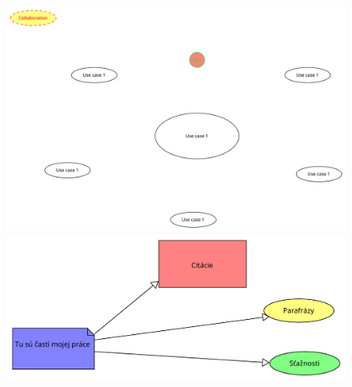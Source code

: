 \documentclass[10pt,twocolumn,twoside,slovak,a4paper]{article}
\begin{document}
\begin{figure}
	\centering
	\includegraphics[scale=0.2]{diagram.pdf}
	\includegraphics[scale=0.4]{diagram horizontal.pdf}
\end{figure}





\newpage



\begin{figure}
	
\end{figure}
\end{document}
